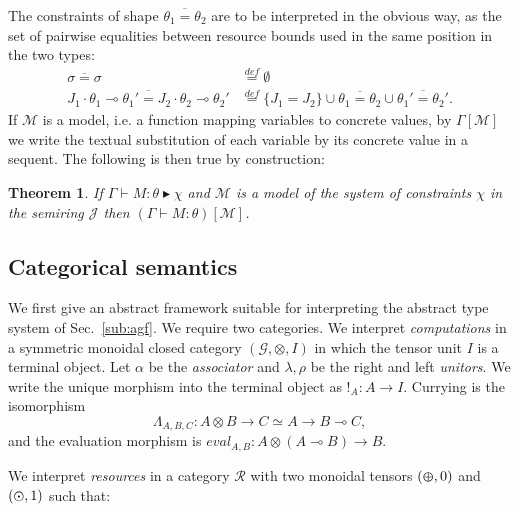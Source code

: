 \documentclass{article}
\newtheorem{theorem}{Theorem}
\newcommand{\catplus}{\varoplus}
\newcommand{\cattimes}{\varodot}
\newcommand{\constr}[2]{#1 \blacktriangleright #2}
\begin{document}
The constraints of shape $\overline{\theta_1=\theta_2}$ are to be interpreted in the obvious way, as the set of pairwise equalities between resource bounds used in the same position in the two types:
\begin{align*}
\overline{\sigma=\sigma}&\stackrel{def}=\emptyset\\
\overline{J_1\cdot\theta_1\multimap\theta_1'=J_2\cdot\theta_2\multimap\theta_2'}&\stackrel{def}=
\{J_1=J_2\}\cup \overline{\theta_1=\theta_2}\cup \overline{\theta_1'=\theta_2'}.
\end{align*}
If $\mathcal M$ is a model, i.e. a function mapping variables to concrete values, by $\Gamma[\mathcal M]$ we write the textual substitution of each variable by its concrete value in a sequent. The following is then true by construction:
\begin{theorem}
If $\constr{\Gamma\vdash M:\theta}\chi$ and $\mathcal M$ is a model of the system of constraints $\chi$ in the semiring $\mathcal J$ then $(\Gamma\vdash M:\theta)[\mathcal M]$.
\end{theorem}

\subsection{Categorical semantics}\label{sec:cf}
We first give an abstract framework suitable for interpreting the
abstract type system of Sec.~\ref{sub:agf}. We  require two
categories. We interpret \emph{computations} in a symmetric monoidal
closed category $(\mathcal G,\otimes,I)$ in which the tensor unit $I$
is a terminal object. Let $\alpha$ be the \emph{associator} and
$\lambda,\rho$ be the right and left \emph{unitors}. We write the
unique morphism into the terminal object as ${!}_A:A\rightarrow
I$. Currying is the isomorphism
\[
\Lambda_{A,B,C}:A\otimes B\rightarrow C\simeq A\rightarrow B\multimap C,
\] 
and the evaluation morphism is $\mathit{eval}_{A,B}:A\otimes (A\multimap B)\rightarrow B$. 

We interpret  \emph{resources} in a  category $\mathcal R$ with two monoidal tensors $(\catplus,0)$ and $(\cattimes,1)$ such that:
\end{document}

